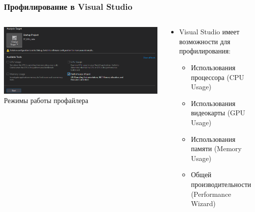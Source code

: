 \documentclass[10pt]{beamer}
\begin{document}
\begin{frame}%
\frametitle{Профилирование в Visual Studio}

\begin{columns}[c]

\begin{center}
  \includegraphics[width=\textwidth]{res/img/AnalysisTarget.png}
  Режимы работы профайлера
\end{center}

\begin{block}{}
\begin{itemize}
  \item Visual Studio имеет возможности для профилирования:
  \begin{itemize}
    \item Использования процессора (CPU Usage)
    \item Использования видеокарты (GPU Usage)
    \item Использования памяти (Memory Usage)
    \item Общей производительности (Performance Wizard)
  \end{itemize}
\end{itemize}
\end{block}

\end{columns}

\end{frame}

\end{document}
